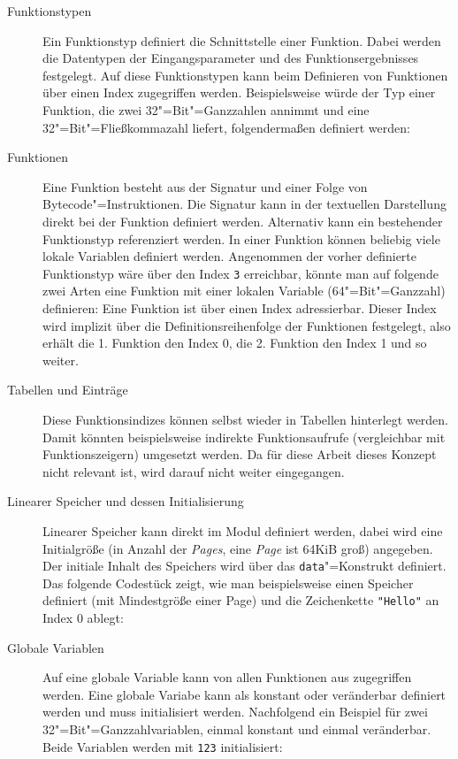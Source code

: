 \begin{description}
    \item[Funktionstypen] Ein Funktionstyp definiert die Schnittstelle einer Funktion. Dabei werden die Datentypen der Eingangsparameter und des Funktionsergebnisses festgelegt. Auf diese Funktionstypen kann beim Definieren von Funktionen über einen Index zugegriffen werden. Beispielsweise würde der Typ einer Funktion, die zwei 32"=Bit"=Ganzzahlen annimmt und eine 32"=Bit"=Fließkommazahl liefert, folgendermaßen definiert werden: 
    \item[Funktionen] Eine Funktion besteht aus der Signatur und einer Folge von Bytecode"=Instruktionen. Die Signatur kann in der textuellen Darstellung direkt bei der Funktion definiert werden. Alternativ kann ein bestehender Funktionstyp referenziert werden. In einer Funktion können beliebig viele lokale Variablen definiert werden. Angenommen der vorher definierte Funktionstyp wäre über den Index \lstinline{3} erreichbar, könnte man auf folgende zwei Arten eine Funktion mit einer lokalen Variable (64"=Bit"=Ganzzahl) definieren: 
    Eine Funktion ist über einen Index adressierbar. Dieser Index wird implizit über die Definitionsreihenfolge der Funktionen festgelegt, also erhält die 1. Funktion den Index 0, die 2. Funktion den Index 1 und so weiter.
    \item[Tabellen und Einträge] Diese Funktionsindizes können selbst wieder in Tabellen hinterlegt werden. Damit könnten beispielsweise indirekte Funktionsaufrufe (vergleichbar mit Funktionszeigern) umgesetzt werden. Da für diese Arbeit dieses Konzept nicht relevant ist, wird darauf nicht weiter  eingegangen.
    \item[Linearer Speicher und dessen Initialisierung] Linearer Speicher kann direkt im Modul definiert werden, dabei wird eine Initialgröße (in Anzahl der \emph{Pages}, eine \emph{Page} ist 64KiB groß) angegeben. Der initiale Inhalt des Speichers wird über das \lstinline{data}"=Konstrukt definiert. Das folgende Codestück zeigt, wie man beispielsweise einen Speicher definiert (mit Mindestgröße einer Page) und die Zeichenkette \lstinline{"Hello"} an Index 0 ablegt: 
    \item[Globale Variablen] Auf eine globale Variable kann von allen Funktionen aus zugegriffen werden. Eine globale Variabe kann als konstant oder veränderbar definiert werden und muss initialisiert werden. Nachfolgend ein Beispiel für zwei 32"=Bit"=Ganzzahlvariablen, einmal konstant und einmal veränderbar. Beide Variablen werden mit \lstinline{123} initialisiert: 

\end{description}

